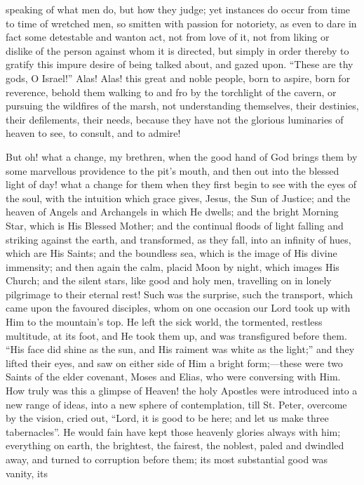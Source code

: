 speaking of what men do, but how they judge; yet instances do occur
from time to time of wretched men, so smitten with passion for
notoriety, as even to dare in fact some detestable and wanton act, not
from love of it, not from liking or dislike of the person against whom
it is directed, but simply in order thereby to gratify this impure
desire of being talked about, and gazed upon. ``These are thy
gods, O Israel!'' Alas! Alas! this great and noble people, born to
aspire, born for reverence, behold them walking to and fro by the
torchlight of the cavern, or pursuing the wildfires of the marsh, not
understanding themselves, their destinies, their defilements, their
needs, because they have not the glorious luminaries of heaven to see,
to consult, and to admire!

But oh! what a change, my brethren, when the good hand of God
brings them by some marvellous providence to the pit's mouth, and then
out into the blessed light of day! what a change for them when they
first begin to see with the eyes of the soul, with the intuition which
grace gives, Jesus, the Sun of Justice; and the heaven of Angels and
Archangels in which He dwells; and the bright Morning Star, which is
His Blessed Mother; and the continual floods of light falling and
striking against the earth, and transformed, as they fall, into an
infinity of hues, which are His Saints; and the boundless sea, which
is the image of His divine immensity; and then again the calm, placid
Moon by night, which images His Church; and the silent stars, like
good and holy men, travelling on in lonely pilgrimage to their eternal
rest! Such was the surprise, such the transport, which came upon the
favoured disciples, whom on one occasion our Lord took up with Him to
the mountain's top. He left the sick world, the tormented, restless
multitude, at its foot, and He took them up, and was transfigured
before them. ``His face did shine as the sun, and His raiment was
white as the light;'' and they lifted their eyes, and saw on
either side of Him a bright form;—these were two Saints of the elder
covenant, Moses and Elias, who were conversing with Him. How truly was
this a glimpse of Heaven! the holy Apostles were introduced into a new
range of ideas, into a new sphere of contemplation, till St. Peter,
overcome by the vision, cried out, ``Lord, it is good to be here;
and let us make three tabernacles''. He would fain have kept those
heavenly glories always with him; everything on earth, the brightest,
the fairest, the noblest, paled and dwindled away, and turned to
corruption before them; its most substantial good was vanity, its

